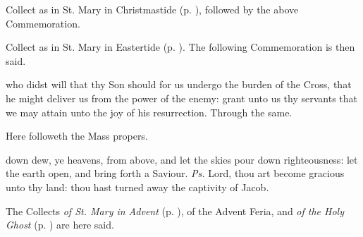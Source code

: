 
\begin{rubric}
	Collect as in St. Mary in Christmastide (p. \pageref{SPMaryPostChristmas}), followed by the above Commemoration.
\end{rubric}
\begin{rubric}
	Collect as in St. Mary in Eastertide (p. \pageref{SPMaryInEaster}). The following Commemoration is then said.
\end{rubric}
 who didst will that thy Son should for us undergo the burden of the Cross, that he might deliver us from the power of the enemy: grant unto us thy servants that we may attain unto the joy of his resurrection. Through the same.
\begin{rubric}
	Here followeth the Mass propers.
\end{rubric}
\introit
{} down dew, ye heavens, from above, and let the skies pour down righteousness: let the earth open, and bring forth a Saviour. \textit{Ps.} Lord, thou art become gracious unto thy land: thou hast turned away the captivity of Jacob.
\begin{rubric}
    The Collects \emph{of St. Mary in Advent} (p. \pageref{SPMaryInAdvent}), of the Advent Feria, and \emph{of the Holy Ghost} (p. \pageref{SPHolyGhost}) are here said.
\end{rubric}
